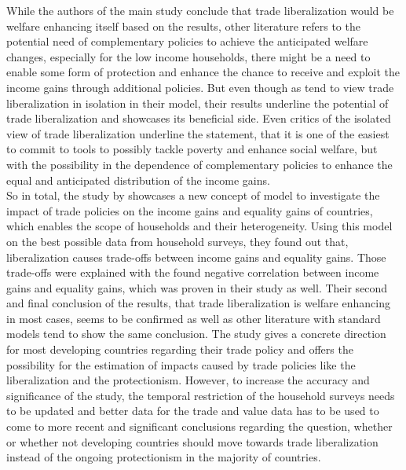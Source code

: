 While the authors of the main study conclude that trade liberalization would be welfare enhancing itself based on the results,
other literature refers to the potential need of complementary policies to achieve the anticipated welfare changes, especially
for the low income households, there might be a need to enable some form of protection and enhance the chance to receive and
exploit the income gains through additional policies. But even though as \cite{Artuc.2019} tend to view trade 
liberalization in isolation in their model, their results underline the potential of trade liberalization and showcases its 
beneficial side. Even critics of the isolated view of trade liberalization underline the statement, that it is one of the
easiest to commit to tools to possibly tackle poverty and enhance social welfare, but with the possibility in the dependence
of complementary policies to enhance the equal and anticipated distribution of the income gains. \\

So in total, the study by \cite{Artuc.2019} showcases a new concept of model to investigate the impact of
trade policies on the income gains and equality gains of countries, which enables the scope of households and their heterogeneity.
Using this model on the best possible data from household surveys, they found out that, liberalization causes
trade-offs between income gains and equality gains. Those trade-offs were explained with the found negative correlation between income gains
and equality gains, which was proven in their study as well. Their second and final conclusion of the results, that trade liberalization is 
welfare enhancing in most cases, seems to be confirmed as well as other literature with standard models tend to show the same conclusion. 
The study gives a concrete direction for most developing countries regarding their trade policy and offers the possibility for the estimation 
of impacts caused by trade policies like the liberalization and the protectionism. 
However, to increase the accuracy and significance of the study, the temporal restriction of the household surveys needs to be updated
and better data for the trade and value data has to be used to come to more recent and significant conclusions regarding the question, 
whether or whether not developing countries should move towards trade liberalization instead of the ongoing protectionism in the majority
of countries.





